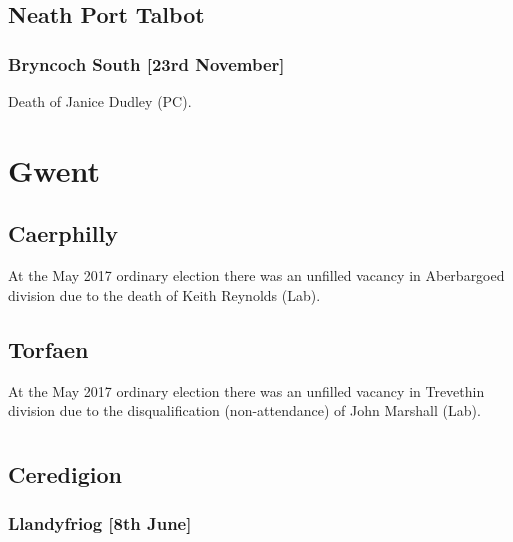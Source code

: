 \documentclass[a4paper,openany]{book}
\begin{document}
\begin{resultsiii}
\subsection*{Neath Port Talbot}

\subsubsection*{Bryncoch South \hspace*{\fill}\nolinebreak[1]%
\enspace\hspace*{\fill}
[23rd November]}


Death of Janice Dudley (PC).

\section{Gwent}

\subsection*{Caerphilly}

At the May 2017 ordinary election there was an unfilled vacancy in Aberbargoed division due to the death of Keith Reynolds (Lab).

\subsection*{Torfaen}

At the May 2017 ordinary election there was an unfilled vacancy in Trevethin division due to the disqualification (non-attendance) of John Marshall (Lab).

\section[Mid and West Wales]{}

\subsection*{Ceredigion}

\subsubsection*{Llandyfriog \hspace*{\fill}\nolinebreak[1]%
\enspace\hspace*{\fill}
[8th June]}


\end{resultsiii}
\end{document}
